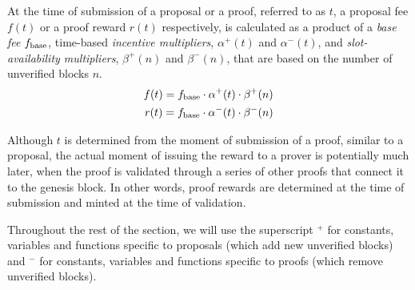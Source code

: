 At the time of submission of a proposal or a proof, referred to as $t$, a proposal fee $f(t)$ or a proof reward $r(t)$ respectively, is calculated as a product of a \textit{base fee} $f_\textnormal{base}$, time-based \emph{incentive multipliers}, $\alpha^+(t)$ and $\alpha^-(t)$, and \emph{slot-availability multipliers}, $\beta^+(n)$ and $\beta^-(n)$, that are based on the number of unverified blocks $n$.
\begin{align}
f(t) = f_\textnormal{base} \cdot \alpha^+(t) \cdot \beta^+(n)
\\
r(t) = f_\textnormal{base}
\cdot \alpha^-(t) \cdot \beta^-(n)
\end{align}

Although $t$ is determined from the moment of submission of a proof, similar to a proposal, the actual moment of issuing the reward to a prover is potentially much later, when the proof is validated through a series of other proofs that connect it to the genesis block. In other words, proof rewards are determined at the time of submission and minted at the time of validation.

Throughout the rest of the section, we will use the superscript $^+$ for constants, variables and functions specific to proposals (which add new unverified blocks) and $^-$ for constants, variables and functions specific to proofs (which remove unverified blocks).



